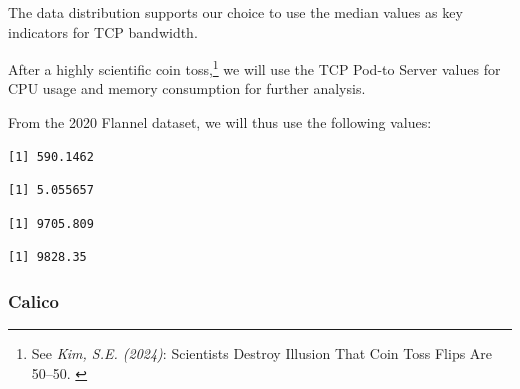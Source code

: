 The data distribution supports our choice to use the median values as key indicators for TCP bandwidth.

After a highly scientific coin toss,\footnote{See \textit{Kim, S.E. (2024)}: Scientists Destroy Illusion That Coin Toss Flips Are 50–50. \cite{coinToss}} we will use the TCP Pod-to Server values for CPU usage and memory consumption for further analysis.

From the 2020 Flannel dataset, we will thus use the following values:

\begin{Shaded}
\begin{Highlighting}[]
\SpecialCharTok{\$}
\end{Highlighting}
\end{Shaded}

\begin{verbatim}
[1] 590.1462
\end{verbatim}

\begin{Shaded}
\begin{Highlighting}[]
\SpecialCharTok{\$}
\end{Highlighting}
\end{Shaded}

\begin{verbatim}
[1] 5.055657
\end{verbatim}

\begin{Shaded}
\begin{Highlighting}[]
\SpecialCharTok{\$}
\end{Highlighting}
\end{Shaded}

\begin{verbatim}
[1] 9705.809
\end{verbatim}

\begin{Shaded}
\begin{Highlighting}[]
\SpecialCharTok{\$}
\end{Highlighting}
\end{Shaded}

\begin{verbatim}
[1] 9828.35
\end{verbatim}

\subsubsection{Calico}

